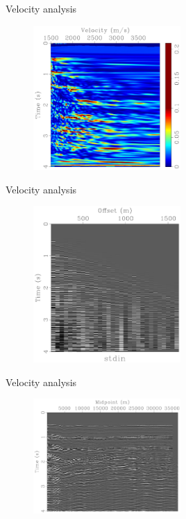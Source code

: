 \documentclass[xcolor=dvipsnames,notes]{beamer}
\begin{document}
\begin{frame}{Velocity analysis}
\begin{figure}
 \includegraphics[width=0.50\textwidth]{Fig/scn-1.pdf}
\end{figure}
\end{frame}
\begin{frame}{Velocity analysis}
\begin{figure}
 \includegraphics[width=0.50\textwidth]{Fig/nmo.pdf}
\end{figure}
\end{frame}
\begin{frame}{Velocity analysis}
\begin{figure}
 \includegraphics[width=0.50\textwidth]{Fig/stack.pdf}
\end{figure}
\end{frame}
\end{document}
